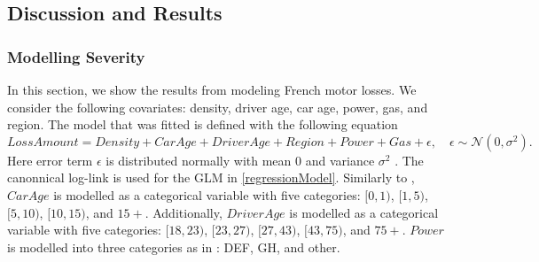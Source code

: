\documentclass[11pt,letterpaper]{article}
\numberwithin{equation}{section}
\numberwithin{equation}{section}
\numberwithin{equation}{section}
\begin{document}
\subsection{Discussion and Results}
\subsubsection{Modelling Severity}
In this section, we show the results from modeling French motor losses. We consider the following covariates: density, driver age, car age, power, gas,  and region. %
The model that was fitted is defined with the following equation
\begin{equation}
Loss Amount =  Density + Car Age + Driver Age + Region + Power + Gas + \epsilon, \quad \epsilon \sim \mathcal{N}(0,\sigma^2). \label{regressionModel}
\end{equation}
Here error term $\epsilon$ is distributed normally with mean $0$ and variance $\sigma^2$ .
The canonnical log-link is used for the GLM in \eqref{regressionModel}. Similarly to \cite{risks_miljkovic},
$CarAge$ is modelled as a categorical variable with five categories: $[0,1)$, $[1,5)$, $[5,10)$, $[10,15)$, and $15+$. Additionally, $DriverAge$ is modelled as a categorical variable with five categories: $[18,23)$, $[23,27)$, $[27,43)$, $[43,75)$, and $75+$. $Power$ is modelled into three categories as in \cite{Charpentier:2014}:
DEF, GH, and other.
\end{document}
